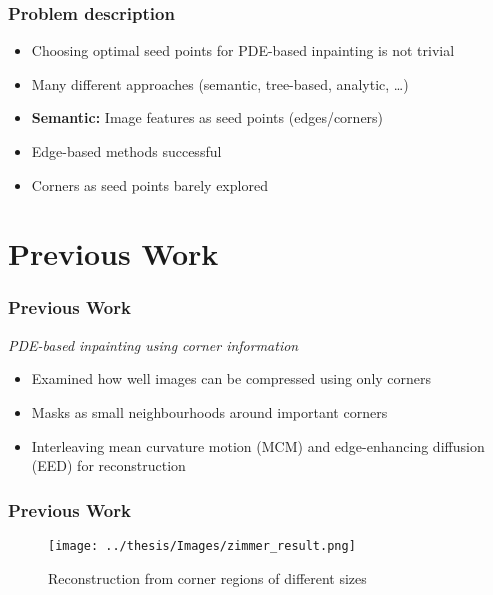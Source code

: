 \documentclass{beamer}
\begin{document}
    \begin{frame}[t]
        \frametitle{Problem description}
        \begin{itemize}[<+-|alert@+>]
            \item Choosing optimal seed points for PDE-based inpainting is not trivial
            \item Many different approaches (semantic, tree-based, analytic, \dots)
            \item \textbf{Semantic:} Image features as seed points (edges/corners)
            \item Edge-based methods successful~\cite{mainberger10}
            \item Corners as seed points barely explored
        \end{itemize}
    \end{frame}

    \section{Previous Work}
    \begin{frame}[t]
        \frametitle{Previous Work}
        \textit{PDE-based inpainting using corner information~\cite{zimmer07}}\nobreak
        \begin{itemize}[<+-|alert@+>]
            \item Examined how well images can be compressed using only corners
            \item Masks as small neighbourhoods around important corners
            \item Interleaving mean curvature motion (MCM) and edge-enhancing diffusion
                (EED) for reconstruction
        \end{itemize}
    \end{frame}

    \begin{frame}[t]
        \frametitle{Previous Work}
        \begin{figure}
            \centering
            \texttt{[image: ../thesis/Images/zimmer\_result.png]}
            \caption{Reconstruction from corner regions of different sizes~\cite{zimmer07}}
        \end{figure}
    \end{frame}
\end{document}
